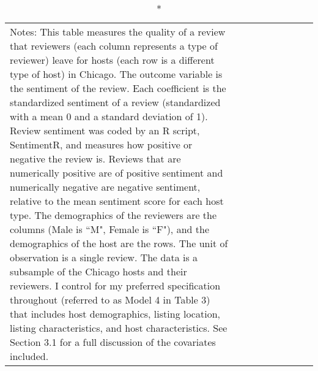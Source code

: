 \begin{sidewaystable}
{\begin{longtable}{l*{8}{c}}
\caption*{Notes: This table measures the quality of a review that reviewers (each column represents a type of reviewer) leave for hosts (each row is a different type of host) in Chicago. The outcome variable is the sentiment of the review. Each coefficient is the standardized sentiment of a review (standardized with a mean 0 and a standard deviation of 1). Review sentiment was coded by an R script, SentimentR, and measures how positive or negative the review is. Reviews that are numerically positive are of positive sentiment and numerically negative are negative sentiment, relative to the mean sentiment score for each host type. The demographics of the reviewers are the columns (Male is ``M", Female is ``F"), and the demographics of the host are the rows. The unit of observation is a single review. The data is a subsample of the Chicago hosts and their reviewers. I control for my preferred specification throughout (referred to as Model 4 in Table 3) that includes host demographics, listing location, listing characteristics, and host characteristics. See Section 3.1 for a full discussion of the covariates included.}
\end{longtable}
}

\end{sidewaystable}

